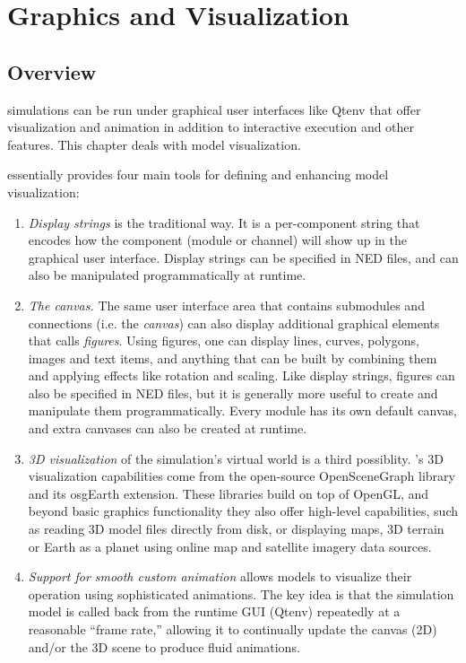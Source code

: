 \chapter{Graphics and Visualization}
\label{cha:graphics}

\section{Overview}
\label{sec:graphics:overview}

{\opp} simulations can be run under graphical user interfaces like Qtenv
that offer visualization and animation in addition to interactive
execution and other features. This chapter deals with model visualization.

{\opp} essentially provides four main tools for defining and enhancing
model visualization:

\begin{enumerate}

    \item \textit{Display strings} is the traditional way. It is a
    per-component string that encodes how the component (module or channel)
    will show up in the graphical user interface. Display strings can be
    specified in NED files, and can also be manipulated programmatically at
    runtime.

    \item \textit{The canvas.} The same user interface area that contains
    submodules and connections (i.e. the \textit{canvas}) can also display
    additional graphical elements that {\opp} calls \textit{figures}. Using
    figures, one can display lines, curves, polygons, images and text items,
    and anything that can be built by combining them and applying effects like
    rotation and scaling. Like display strings, figures can also be specified
    in NED files, but it is generally more useful to create and manipulate them
    programmatically. Every module has its own default canvas, and extra canvases
    can also be created at runtime.

    \item \textit{3D visualization} of the simulation's virtual world is a
    third possiblity. {\opp}'s 3D visualization capabilities come from the
    open-source OpenSceneGraph library and its osgEarth extension. These
    libraries build on top of OpenGL, and beyond basic graphics functionality
    they also offer high-level capabilities, such as reading 3D model files
    directly from disk, or displaying maps, 3D terrain or Earth as a planet
    using online map and satellite imagery data sources.

    \item \textit{Support for smooth custom animation} allows models to visualize
    their operation using sophisticated animations. The key idea is that the
    simulation model is called back from the runtime GUI (Qtenv) repeatedly
    at a reasonable ``frame rate,'' allowing it to continually update the
    canvas (2D) and/or the 3D scene to produce fluid animations.

\end{enumerate}

